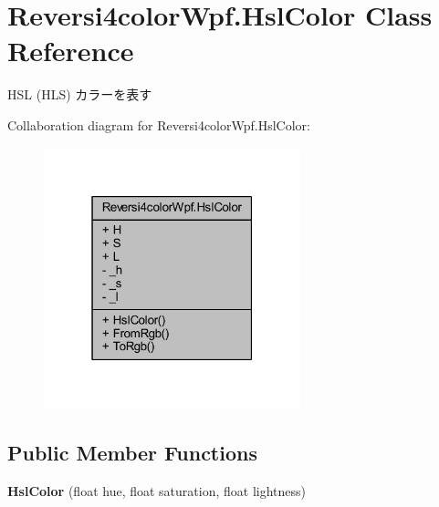 \hypertarget{class_reversi4color_wpf_1_1_hsl_color}{}\section{Reversi4color\+Wpf.\+Hsl\+Color Class Reference}
\label{class_reversi4color_wpf_1_1_hsl_color}


H\+SL (H\+LS) カラーを表す  




Collaboration diagram for Reversi4color\+Wpf.\+Hsl\+Color\+:\nopagebreak
\begin{figure}[H]
\begin{center}
\leavevmode
\includegraphics[width=211pt]{class_reversi4color_wpf_1_1_hsl_color__coll__graph}
\end{center}
\end{figure}
\subsection*{Public Member Functions}
\begin{DoxyCompactItemize}
\item 
\mbox{\label{class_reversi4color_wpf_1_1_hsl_color_a2da983b84103f7499dceeb9487722df1}} 
{\bfseries Hsl\+Color} (float hue, float saturation, float lightness)
\end{DoxyCompactItemize}

